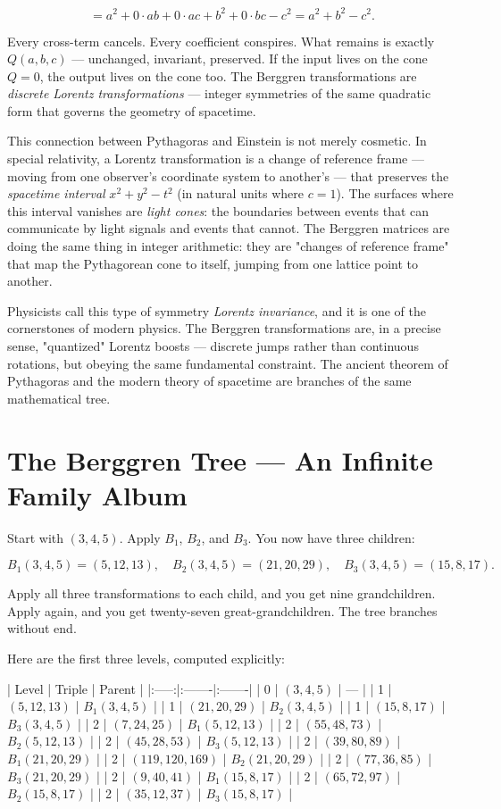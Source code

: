 \documentclass[11pt,twoside,openright]{book}
\theoremstyle{definition}
\theoremstyle{remark}
\begin{document}
\[= a^2 + 0 \cdot ab + 0 \cdot ac + b^2 + 0 \cdot bc - c^2 = a^2 + b^2 - c^2.\]

Every cross-term cancels. Every coefficient conspires. What remains is exactly $Q(a, b, c)$ --- unchanged, invariant, preserved. If the input lives on the cone $Q = 0$, the output lives on the cone too. The Berggren transformations are \textit{discrete Lorentz transformations} --- integer symmetries of the same quadratic form that governs the geometry of spacetime.


This connection between Pythagoras and Einstein is not merely cosmetic. In special relativity, a Lorentz transformation is a change of reference frame --- moving from one observer's coordinate system to another's --- that preserves the \textit{spacetime interval} $x^2 + y^2 - t^2$ (in natural units where $c = 1$). The surfaces where this interval vanishes are \textit{light cones}: the boundaries between events that can communicate by light signals and events that cannot. The Berggren matrices are doing the same thing in integer arithmetic: they are "changes of reference frame" that map the Pythagorean cone to itself, jumping from one lattice point to another.


Physicists call this type of symmetry \textit{Lorentz invariance}, and it is one of the cornerstones of modern physics. The Berggren transformations are, in a precise sense, "quantized" Lorentz boosts --- discrete jumps rather than continuous rotations, but obeying the same fundamental constraint. The ancient theorem of Pythagoras and the modern theory of spacetime are branches of the same mathematical tree.


\section{The Berggren Tree --- An Infinite Family Album}

Start with $(3, 4, 5)$. Apply $B_1$, $B_2$, and $B_3$. You now have three children:

\[B_1(3, 4, 5) = (5, 12, 13), \quad B_2(3, 4, 5) = (21, 20, 29), \quad B_3(3, 4, 5) = (15, 8, 17).\]

Apply all three transformations to each child, and you get nine grandchildren. Apply again, and you get twenty-seven great-grandchildren. The tree branches without end.

Here are the first three levels, computed explicitly:

| Level | Triple | Parent |
|:-----:|:-------|:-------|
| 0 | $(3, 4, 5)$ | --- |
| 1 | $(5, 12, 13)$ | $B_1(3,4,5)$ |
| 1 | $(21, 20, 29)$ | $B_2(3,4,5)$ |
| 1 | $(15, 8, 17)$ | $B_3(3,4,5)$ |
| 2 | $(7, 24, 25)$ | $B_1(5,12,13)$ |
| 2 | $(55, 48, 73)$ | $B_2(5,12,13)$ |
| 2 | $(45, 28, 53)$ | $B_3(5,12,13)$ |
| 2 | $(39, 80, 89)$ | $B_1(21,20,29)$ |
| 2 | $(119, 120, 169)$ | $B_2(21,20,29)$ |
| 2 | $(77, 36, 85)$ | $B_3(21,20,29)$ |
| 2 | $(9, 40, 41)$ | $B_1(15,8,17)$ |
| 2 | $(65, 72, 97)$ | $B_2(15,8,17)$ |
| 2 | $(35, 12, 37)$ | $B_3(15,8,17)$ |
\end{document}
